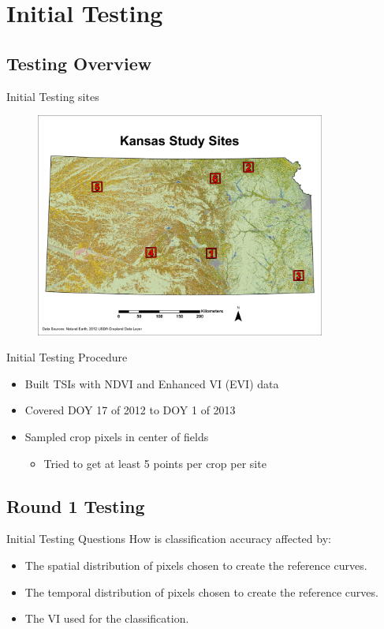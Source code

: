 \documentclass[  compress,xcolor={usenames,dvipsnames}]{beamer}
\begin{document}
\section{Initial Testing}

\subsection{Testing Overview}
\begin{frame}{Initial Testing sites}
\begin{figure}
  \centering
  \includegraphics[width=0.85\textwidth]{Graphics/Testing/STUDYSITES.pdf}
\end{figure}
\end{frame}

\begin{frame}{Initial Testing Procedure}
\begin{itemize}
  \item Built TSIs with NDVI and Enhanced VI (EVI) data
  \item Covered DOY 17 of 2012 to DOY 1 of 2013
  \item Sampled crop pixels in center of fields
  \begin{itemize}
    \item Tried to get at least 5 points per crop per site
  \end{itemize}
\end{itemize}
\end{frame}


\subsection{Round 1 Testing}
\begin{frame}{Initial Testing Questions}
How is classification accuracy affected by:
\begin{itemize}
  \item The spatial distribution of pixels chosen to create the reference curves.
  \item The temporal distribution of pixels chosen to create the reference curves.
  \item The VI used for the classification.
\end{itemize}
\end{frame}
\end{document}
